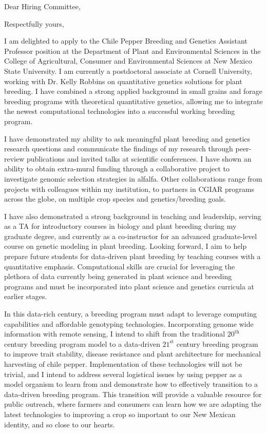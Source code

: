 \documentclass[11pt, letterpaper]{moderncv}
\begin{document}
\date{\today}
\opening{Dear Hiring Committee,}
\closing{Respectfully yours,}
\makelettertitle


I am delighted to apply to the Chile Pepper Breeding and Genetics Assistant Professor position at the Department of Plant and Environmental Sciences in the College of Agricultural, Consumer and Environmental Sciences at New Mexico State University. I am currently a postdoctoral associate at Cornell University, working with Dr. Kelly Robbins on quantitative genetics solutions for plant breeding. I have combined a strong applied background in small grains and forage breeding programs with theoretical quantitative genetics, allowing me to integrate the newest computational technologies into a successful working breeding program.


I have demonstrated my ability to ask meaningful plant breeding and genetics research questions and communicate the findings of my research through peer-review publications and invited talks at scientific conferences. I have shown an ability to obtain extra-mural funding through a collaborative project to investigate genomic selection strategies in alfalfa. Other collaborations range from projects with colleagues within my institution, to partners in CGIAR programs across the globe, on multiple crop species and genetics/breeding goals. 

I have also demonstrated a strong background in teaching and leadership, serving as a TA for introductory courses in biology and plant breeding during my graduate degree, and currently as a co-instructor for an advanced graduate-level course on genetic modeling in plant breeding. Looking forward, I aim to help prepare future students for data-driven plant breeding by teaching courses with a quantitative emphasis. Computational skills are crucial for leveraging the plethora of data currently being generated in plant science and breeding programs and must be incorporated into plant science and genetics curricula at earlier stages. 


In this data-rich century, a breeding program must adapt to leverage computing capabilities and affordable genotyping technologies. Incorporating genome wide information with remote sensing, I intend to shift from the traditional $20^\text{th}$ century breeding program model to a data-driven $21^\text{st}$ century breeding program to improve trait stability, disease resistance and plant architecture for mechanical harvesting of chile pepper. Implementation of these technologies will not be trivial, and I intend to address several logistical issues by using pepper as a model organism to learn from and demonstrate how to effectively transition to a data-driven breeding program. This transition will provide a valuable resource for public outreach, where farmers and consumers can learn how we are adapting the latest technologies to improving a crop so important to our New Mexican identity, and so close to our hearts. 
\end{document}
